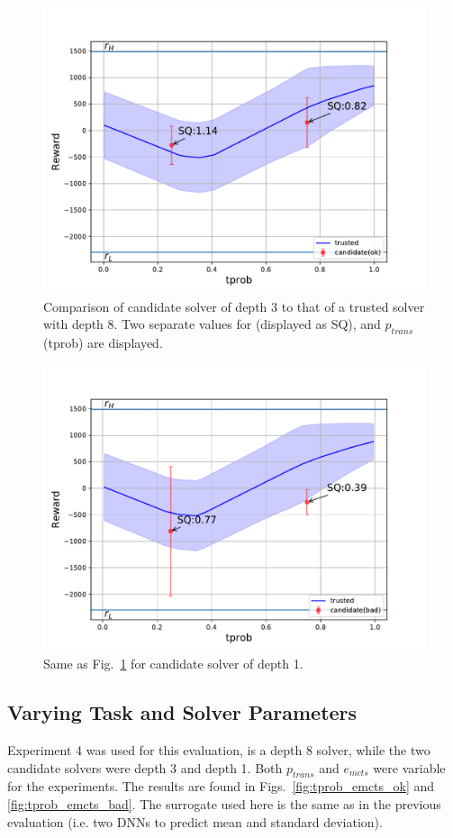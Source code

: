 \begin{figure}[tbp]
    \centering
    \includegraphics[width=0.9\linewidth]{Figures/transition_vary_tprob_ok.pdf}
    \caption{Comparison of candidate solver of depth 3 to that of a trusted solver with depth 8. Two separate values for \xQ{} (displayed as SQ), and $p_{trans}$ (tprob) are displayed.}
    \label{fig:tprob_ok}
\end{figure}
\begin{figure}[tbp]
    \centering
    \includegraphics[width=0.9\linewidth]{Figures/transition_vary_tprob_bad.pdf}
    \caption{Same as Fig.~\ref{fig:tprob_ok} for candidate solver of depth 1.}
    \label{fig:tprob_bad}
\end{figure}

\subsection{Varying Task and Solver Parameters}
Experiment 4 was used for this evaluation, \solverstar{} is a depth 8 solver, while the two candidate solvers were depth 3 and depth 1. Both $p_{trans}$ and $e_{mcts}$ were variable for the experiments. The results are found in Figs.~\ref{fig:tprob_emcts_ok} and \ref{fig:tprob_emcts_bad}. The surrogate \surrogate{} used here is the same as in the previous evaluation (i.e. two DNNs to predict mean and standard deviation).

